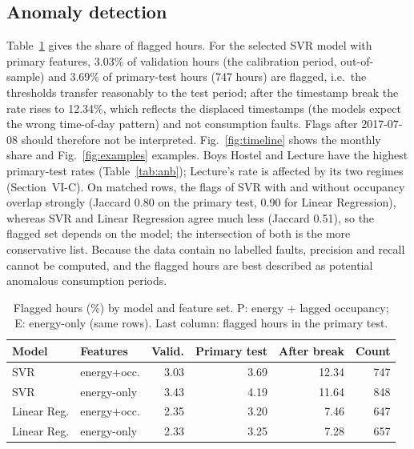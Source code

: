 \documentclass[conference]{IEEEtran}
\begin{document}
\subsection{Anomaly detection}
Table~\ref{tab:an} gives the share of flagged hours. For the selected SVR model with primary features, 3.03\% of validation hours (the calibration period, out-of-sample) and 3.69\% of primary-test hours (747 hours) are flagged,
i.e.\ the thresholds transfer reasonably to the test period; after the timestamp break the rate rises to 12.34\%, which reflects the displaced timestamps (the models expect the wrong time-of-day pattern) and not consumption faults. Flags after 2017-07-08 should therefore not be interpreted.
Fig.~\ref{fig:timeline} shows the monthly share and Fig.~\ref{fig:examples} examples. Boys Hostel and Lecture have the highest primary-test rates (Table~\ref{tab:anb}); Lecture's rate is affected by its two regimes (Section~VI-C).
On matched rows, the flags of SVR with and without occupancy overlap strongly (Jaccard 0.80 on the primary test, 0.90 for Linear Regression), whereas SVR and Linear Regression agree much less (Jaccard 0.51), so the flagged set depends on the model;
the intersection of both is the more conservative list. Because the data contain no labelled faults, precision and recall cannot be computed, and the flagged hours are best described as potential anomalous consumption periods.

\begin{table}[t]
\caption{Flagged hours (\%) by model and feature set. P: energy + lagged occupancy; E: energy-only (same rows). Last column: flagged hours in the primary test.}\label{tab:an}
\centering\small
\begin{tabular}{llrrrr}
\toprule
Model & Features & Valid. & Primary test & After break & Count\\
\midrule
SVR & energy+occ. & 3.03 & 3.69 & 12.34 & 747 \\
SVR & energy-only & 3.43 & 4.19 & 11.64 & 848 \\
Linear Reg. & energy+occ. & 2.35 & 3.20 & 7.46 & 647 \\
Linear Reg. & energy-only & 2.33 & 3.25 & 7.28 & 657 \\

\bottomrule
\end{tabular}
\end{table}
\end{document}

